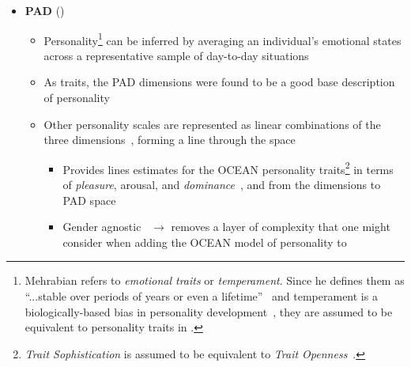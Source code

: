 \begin{itemize}
    \item \textbf{PAD} (\strong)
    \begin{itemize}
        \item Personality\footnote{Mehrabian refers to \textit{emotional
                traits} or \textit{temperament}. Since he defines them as
                ``...stable
            over periods of years or even a
            lifetime''~\citep[p.~262]{mehrabian1996pleasure} and temperament is
            a
            biologically-based bias in personality
            development~\citep{oxfordTemperament}, they are assumed to be
            equivalent to personality traits in \progname{}.} can be inferred by
        averaging an individual's emotional states across a representative
        sample of day-to-day situations~\citep[p.~262]{mehrabian1996pleasure}

        \item As traits, the PAD dimensions were found to be a good base
        description of personality~\citep[p.~64]{mehrabian1980basic}

        \item  Other personality scales are represented as linear combinations
        of the three dimensions~\citep[p.~267]{mehrabian1996pleasure}, forming
        a line through the space
        \begin{itemize}
            \item Provides lines estimates for the OCEAN personality
            traits\footnote{\textit{Trait Sophistication} is assumed to be
                equivalent to \textit{Trait
                    Openness}~\citep[p.~826--827]{mccrae1997conceptions}.} in
                    terms of
            \textit{pleasure}, arousal, and
            \textit{dominance}~\citep[p.~91
            Eq.~11C--13C]{mehrabian1996analysis}, and from the dimensions to
            PAD space~\citep[p.~90 Eq.~1D--5D]{mehrabian1996analysis}

            \item Gender agnostic~\citep[p.~89]{mehrabian1996analysis}
            $\rightarrow$ removes a layer of complexity that one might consider
            when adding the OCEAN model of personality to \progname{}
        \end{itemize}
    \end{itemize}
\end{itemize}

